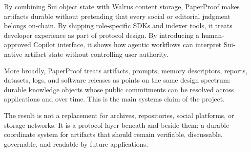 \documentclass[journal]{IEEEtran}
\begin{document}
By combining Sui object state with Walrus content storage, PaperProof makes artifacts durable without pretending that every social or editorial judgment belongs on-chain. By shipping role-specific SDKs and indexer tools, it treats developer experience as part of protocol design. By introducing a human-approved Copilot interface, it shows how agentic workflows can interpret Sui-native artifact state without controlling user authority.

More broadly, PaperProof treats artifacts, prompts, memory descriptors, reports,
datasets, logs, and software releases as points on the same design spectrum:
durable knowledge objects whose public commitments can be resolved across
applications and over time. This is the main systems claim of the project.

The result is not a replacement for archives, repositories, social platforms, or storage networks. It is a protocol layer beneath and beside them: a durable coordinate system for artifacts that should remain verifiable, discussable, governable, and readable by future applications.



\end{document}
